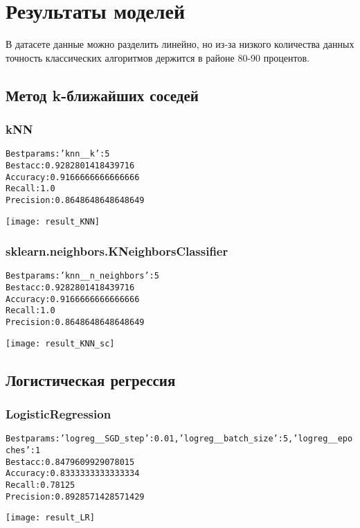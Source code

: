 \graphicspath{{images/}}
\section{Результаты моделей}
В датасете данные можно разделить линейно, но из-за низкого количества данных точность классических алгоритмов держится в районе 80-90 процентов.

\subsection{Метод k-ближайших соседей}
\subsubsection{kNN}
\begin{alltt}
Best params: {'knn__k': 5}
Best acc: 0.9282801418439716
Accuracy: 0.9166666666666666
Recall: 1.0
Precision: 0.8648648648648649
\end{alltt}
\begin{center}
\texttt{[image: result\_KNN]}
\end{center}
\pagebreak

\subsubsection{sklearn.neighbors.KNeighborsClassifier}
\begin{alltt}
Best params: {'knn__n_neighbors': 5}
Best acc: 0.9282801418439716
Accuracy: 0.9166666666666666
Recall: 1.0
Precision: 0.8648648648648649
\end{alltt}
\begin{center}
\texttt{[image: result\_KNN\_sc]}
\end{center}
\pagebreak

\subsection{Логистическая регрессия}
\subsubsection{LogisticRegression}
\begin{alltt}
Best params: {'logreg__SGD_step': 0.01, 'logreg__batch_size': 5, 'logreg__epoches': 1}
Best acc: 0.8479609929078015
Accuracy: 0.8333333333333334
Recall: 0.78125
Precision: 0.8928571428571429
\end{alltt}
\begin{center}
\texttt{[image: result\_LR]}
\end{center}

